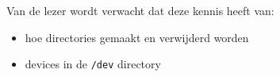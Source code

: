 Van de lezer wordt verwacht dat deze kennis heeft van:
\begin{itemize}
\item hoe directories gemaakt en verwijderd worden
\item devices in de \texttt{/dev} directory
\end{itemize}

